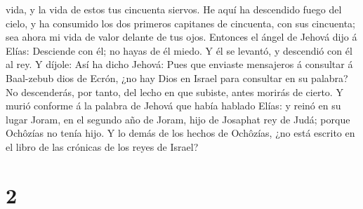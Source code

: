 vida, y la vida de estos tus cincuenta siervos.  He aquí
ha descendido fuego del cielo, y ha consumido los dos primeros capitanes
de cincuenta, con sus cincuenta; sea ahora mi vida de valor delante de
tus ojos.  Entonces el ángel de Jehová dijo á Elías:
Desciende con él; no hayas de él miedo. Y él se levantó, y descendió con
él al rey.  Y díjole: Así ha dicho Jehová: Pues que
enviaste mensajeros á consultar á Baal-zebub dios de Ecrón, ¿no hay Dios
en Israel para consultar en su palabra? No descenderás, por tanto, del
lecho en que subiste, antes morirás de cierto.  Y murió
conforme á la palabra de Jehová que había hablado Elías: y reinó en su
lugar Joram, en el segundo año de Joram, hijo de Josaphat rey de Judá;
porque Ochôzías no tenía hijo.  Y lo demás de los hechos
de Ochôzías, ¿no está escrito en el libro de las crónicas de los reyes
de Israel?

\hypertarget{section-1}{%
\section{2}\label{section-1}}

